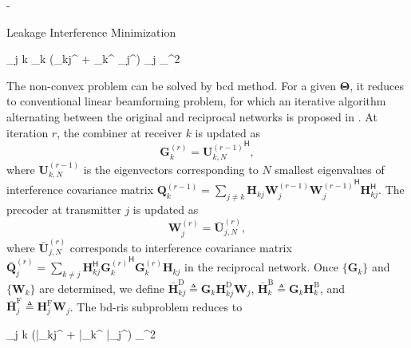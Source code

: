 \documentclass[journal]{IEEEtran}
\begin{document}
\begin{section}{-}
	\begin{subsection}{Leakage Interference Minimization}
		\begin{mini!}
			{}{\mathop{\sum\sum}_{j \neq k} \left\lVert {}_k (_{kj}^ + _k^ \mathbf{\Theta} _j^) _j \right\rVert _{}^2}{}{}
		\end{mini!}
		The non-convex problem can be solved by \gls{bcd} method.
		For a given $\mathbf{\Theta}$, it reduces to conventional linear beamforming problem, for which an iterative algorithm alternating between the original and reciprocal networks is proposed in \cite{Gomadam2011,Clerckx2013}.
		At iteration $r$, the combiner at receiver $k$ is updated as
		\begin{equation}
			\mathbf{G}_k^{(r)} = {\mathbf{U}_{k,N}^{(r-1)}}^\mathsf{H},
		\end{equation}
		where $\mathbf{U}_{k,N}^{(r-1)}$ is the eigenvectors corresponding to $N$ smallest eigenvalues of interference covariance matrix $\mathbf{Q}_k^{(r-1)} = \sum_{j \ne k} \mathbf{H}_{kj} \mathbf{W}_j^{(r-1)} {\mathbf{W}_j^{(r-1)}}^\mathsf{H} \mathbf{H}_{kj}^\mathsf{H}$.
		The precoder at transmitter $j$ is updated as
		\begin{equation}
			\mathbf{W}_j^{(r)} = \bar{\mathbf{U}}_{j,N}^{(r)},
		\end{equation}
		where $\bar{\mathbf{U}}_{j,N}^{(r)}$ corresponds to interference covariance matrix $\bar{\mathbf{Q}}_j^{(r)} = \sum_{k \ne j} \mathbf{H}_{kj}^\mathsf{H} {\mathbf{G}_k^{(r)}}^\mathsf{H} \mathbf{G}_k^{(r)} \mathbf{H}_{kj}$ in the reciprocal network.
		Once $\{\mathbf{G}_k\}$ and $\{\mathbf{W}_k\}$ are determined, we define $\bar{\mathbf{H}}_{kj}^\mathrm{D} \triangleq \mathbf{G}_k \mathbf{H}_{kj}^\mathrm{D} \mathbf{W}_j$, $\bar{\mathbf{H}}_k^\mathrm{B} \triangleq \mathbf{G}_k \mathbf{H}_k^\mathrm{B}$, and $\bar{\mathbf{H}}_j^\mathrm{F} \triangleq \mathbf{H}_j^\mathrm{F} \mathbf{W}_j$.
		The \gls{bd}-\gls{ris} subproblem reduces to
		\begin{mini!}
			{\scriptstyle{\mathbf{\Theta}}}{\mathop{\sum\sum}_{j \neq k} \left\lVert (\bar{}_{kj}^ + \bar{}_k^ \mathbf{\Theta} \bar{}_j^) \right\rVert _{}^2}{\label{op:ic_interference_ris}}{}
			\addConstraint{\mathbf{\Theta}_g^\mathsf{H} \mathbf{\Theta}_g=\mathbf{I}, \quad \forall g.}{}{}
		\end{mini!}


\end{subsection}
\end{section}
\end{document}
